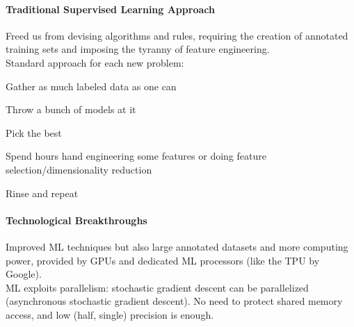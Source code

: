 \documentclass[10pt]{report}
\begin{document}
\paragraph{Traditional Supervised Learning Approach} Freed us from devising algorithms and rules, requiring the creation of annotated training sets and imposing the tyranny of feature engineering.\\
Standard approach for each new problem:
\begin{list}{}{}
	\item Gather as much labeled data as one can
	\item Throw a bunch of models at it
	\item Pick the best
	\item Spend hours hand engineering some features or doing feature selection/dimensionality reduction
	\item Rinse and repeat
\end{list}
\paragraph{Technological Breakthroughs} Improved ML techniques but also large annotated datasets and more computing power, provided by GPUs and dedicated ML processors (like the TPU by Google).\\
ML exploits parallelism: stochastic gradient descent can be parallelized (asynchronous stochastic gradient descent). No need to protect shared memory access, and low (half, single) precision is enough.
\end{document}
